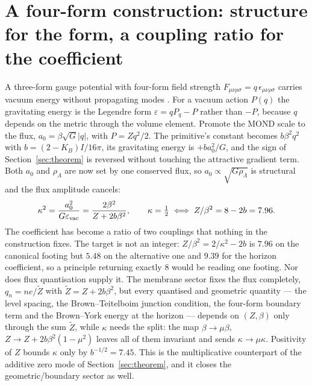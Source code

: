 \documentclass[fleqn,usenatbib]{mnras}
\begin{document}
\section{A four-form construction: structure for the form, a coupling ratio for the coefficient}
\label{sec:fourform}
A three-form gauge potential with four-form field strength $F_{\mu\nu\rho\sigma}=q\,\epsilon_{\mu\nu\rho\sigma}$ carries vacuum energy without propagating modes \citep{DuffvanNieuwenhuizen1980,BoussoPolchinski2000}. For a vacuum action $P(q)$ the gravitating energy is the Legendre form $\varepsilon=qP_q-P$ rather than $-P$, because $q$ depends on the metric through the volume element. Promote the MOND scale to the flux, $a_0=\beta\sqrt G|q|$, with $P=Zq^2/2$. The primitive's constant becomes $b\beta^2q^2$ with $b=(2-K_B)I/16\pi$, its gravitating energy is $+ba_0^2/G$, and the sign of Section~\ref{sec:theorem} is reversed without touching the attractive gradient term. Both $a_0$ and $\rho_\Lambda$ are now set by one conserved flux, so $a_0\propto\sqrt{G\rho_\Lambda}$ is structural and the flux amplitude cancels:
\begin{equation}
\kappa^2=\frac{a_0^2}{G\varepsilon_{\rm vac}}=\frac{2\beta^2}{Z+2b\beta^2},\qquad \kappa=\tfrac12\iff Z/\beta^2=8-2b=7.96.
\label{eq:fourform}
\end{equation}
The coefficient has become a ratio of two couplings that nothing in the construction fixes. The target is not an integer: $Z/\beta^2=2/\kappa^2-2b$ is $7.96$ on the canonical footing but $5.48$ on the alternative one and $9.39$ for the horizon coefficient, so a principle returning exactly $8$ would be reading one footing. Nor does flux quantisation supply it. The membrane sector fixes the flux completely, $q_n=ne/\tilde Z$ with $\tilde Z=Z+2b\beta^2$, but every quantised and geometric quantity --- the level spacing, the Brown--Teitelboim junction condition, the four-form boundary term and the Brown--York energy at the horizon --- depends on $(Z,\beta)$ only through the sum $\tilde Z$, while $\kappa$ needs the split: the map $\beta\to\mu\beta$, $Z\to Z+2b\beta^2(1-\mu^2)$ leaves all of them invariant and sends $\kappa\to\mu\kappa$. Positivity of $Z$ bounds $\kappa$ only by $b^{-1/2}=7.45$. This is the multiplicative counterpart of the additive zero mode of Section~\ref{sec:theorem}, and it closes the geometric/boundary sector as well.
\end{document}
